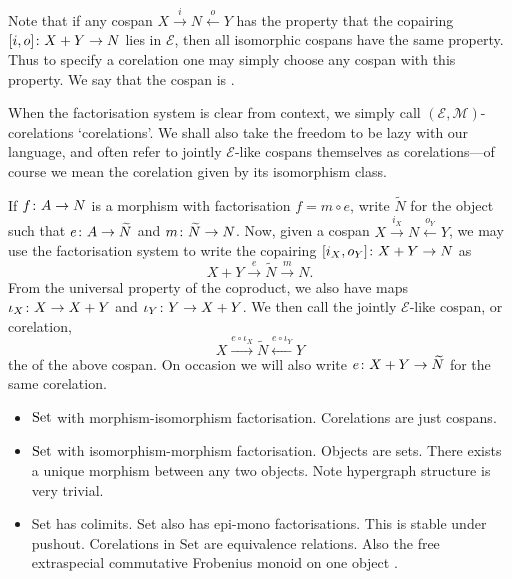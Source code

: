 Note that if any cospan $X \stackrel{i}\longrightarrow N
\stackrel{o}\longleftarrow Y$ has the property that the copairing $[i,o]{\colon}
X+Y \to N$ lies in $\mathcal E$, then all isomorphic cospans have the same
property. Thus to specify a corelation one may simply choose any cospan with
this property. We say that the cospan is .

When the factorisation system is clear from context, we simply call $(\mathcal
E,\mathcal M)$-corelations `corelations'. We shall also take the freedom to be
lazy with our language, and often refer to jointly $\mathcal E$-like cospans
themselves as corelations---of course we mean the corelation given by its
isomorphism class.

If $f{\colon} A \to N$ is a morphism with factorisation $f = m \circ e$, write
$\widetilde N$ for the object such that $e{\colon} A \to \widetilde N$ and $m{\colon}
\widetilde N \to N$. Now, given a cospan $X \stackrel{i_X}{\longrightarrow} N
\stackrel{o_Y}{\longleftarrow} Y$, we may use the factorisation system to write
the copairing $[i_X,o_Y]{\colon} X+Y \to N$ as
\[
  X+Y \stackrel{e}{\longrightarrow} \widetilde{N} \stackrel{m}{\longrightarrow}
  N.
\]
From the universal property of the coproduct, we also have maps $\iota_X{\colon} X
\to X+Y$ and $\iota_Y{\colon} Y \to X+Y$. We then call the jointly $\mathcal
E$-like cospan, or corelation,
\[
  X \stackrel{e\circ \iota_X}{\longrightarrow} \widetilde{N} \stackrel{e \circ
  \iota_Y}{\longleftarrow} Y
\]
the  of the above cospan. On occasion we will also
write $e{\colon} X+Y \to \widetilde N$ for the same corelation.

\begin{examples}
  \begin{itemize}
    \item $\mathrm{Set}$ with morphism-isomorphism factorisation. Corelations are just cospans.
    \item $\mathrm{Set}$ with isomorphism-morphism factorisation. Objects are sets. There exists
      a unique morphism between any two objects. Note hypergraph structure is very
      trivial.
    \item Set has colimits. Set also has epi-mono factorisations. This is stable under
  pushout. Corelations in $\mathrm{Set}$ are equivalence relations. Also the free
  extraspecial commutative Frobenius monoid on one object \cite{CF}.
  \end{itemize}
\end{examples}

